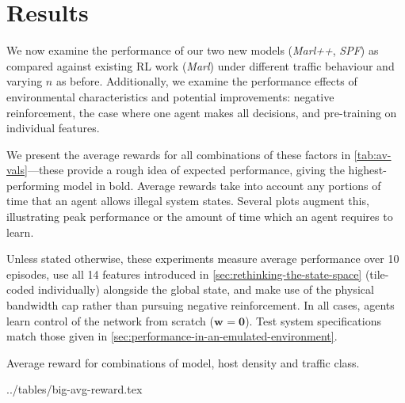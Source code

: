 \documentclass[conference, letterpaper, 10pt, times]{IEEEtran}
\newcommand{\wvec}[1]{\ensuremath{\bm{w}_{#1}}}
\begin{document}


\section{Results}
\label{sec:the-results-of-doing-so}

We now examine the performance of our two new models (\emph{Marl++}, \emph{SPF}) as compared against existing RL work (\emph{Marl}) under different traffic behaviour and varying $n$ as before.
Additionally, we examine the performance effects of environmental characteristics and potential improvements: negative reinforcement, the case where one agent makes all decisions, and pre-training on individual features.

We present the average rewards for all combinations of these factors in \cref{tab:av-vals}---these provide a rough idea of expected performance, giving the highest-performing model in bold.
Average rewards take into account any portions of time that an agent allows illegal system states.
Several plots augment this, illustrating peak performance or the amount of time which an agent requires to learn.

Unless stated otherwise, these experiments measure average performance over 10 episodes, use all \num{14} features introduced in \cref{sec:rethinking-the-state-space} (tile-coded individually) alongside the global state, and make use of the physical bandwidth cap rather than pursuing negative reinforcement.
In all cases, agents learn control of the network from scratch ($\wvec{}=\bm{0}$).
Test system specifications match those given in \cref{sec:performance-in-an-emulated-environment}.

\begin{table}
	\centering
	\caption{Average reward for combinations of model, host density and traffic class.\label{tab:av-vals}}
	
	\expandableinput ../tables/big-avg-reward.tex
\end{table}
\end{document}
